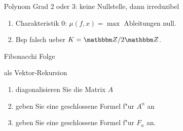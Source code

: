 \documentclass[a4,11pt]{article}
\begin{document}
\vspace*{-17mm}
{
\kopf
}


\begin{aufgabe}[4 Punkte]
Polynom Grad 2 oder 3: keine Nullstelle, dann irreduzibel
\end{aufgabe}

\begin{aufgabe}[4 Punkte]
  
\begin{enumerate}
\item Charakteristik 0: $\mu(f,x) = \max$ Ableitungen null.
\item Bsp falsch ueber $K = \Z/2\Z$.
\end{enumerate}

\end{aufgabe}

\begin{aufgabe}[4 Punkte]
Fibonacchi Folge

als Vektor-Rekursion
  
\begin{enumerate}
\item diagonalisieren Sie die Matrix $A$
\item geben Sie eine geschlossene Formel f"ur $A^n$ an
\item geben Sie eine geschlossene Formel f"ur $F_n$ an.
\end{enumerate}

\end{aufgabe}
\end{document}
